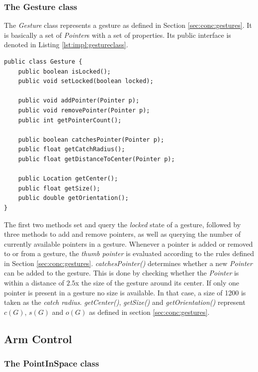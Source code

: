 \subsubsection{The Gesture class}

The \textit{Gesture} class represents a gesture as defined in Section \ref{sec:conc:gestures}. It is basically a set of \textit{Pointer}s with a set of properties. Its public interface is denoted in Listing \ref{lst:impl:gestureclass}.

\begin{lstlisting}[caption={Public interface of the Gesture class},label=lst:impl:gestureclass]
public class Gesture {
	public boolean isLocked();
	public void setLocked(boolean locked);
	
	public void addPointer(Pointer p);
	public void removePointer(Pointer p);
	public int getPointerCount();
	
	public boolean catchesPointer(Pointer p);
	public float getCatchRadius();
	public float getDistanceToCenter(Pointer p);
	
	public Location getCenter();
	public float getSize();
	public double getOrientation();
}
\end{lstlisting}

The first two methods set and query the \textit{locked} state of a gesture, followed by three methods to add and remove pointers, as well as querying the number of currently available pointers in a gesture. Whenever a pointer is added or removed to or from a gesture, the \textit{thumb pointer} is evaluated according to the rules defined in Section \ref{sec:conc:gestures}.
\textit{catchesPointer()} determines whether a new \textit{Pointer} can be added to the gesture. This is done by checking whether the \textit{Pointer}  is within a distance of $2.5$x the size of the gesture around its center. If only one pointer is present in a gesture no size is available. In that case, a size of 1200 is taken as the \textit{catch radius}. \textit{getCenter()}, \textit{getSize()} and \textit{getOrientation()} represent $c(G)$, $s(G)$ and $o(G)$ as defined in section \ref{sec:conc:gestures}.

\subsection{Arm Control}

\subsubsection{The PointInSpace class}

